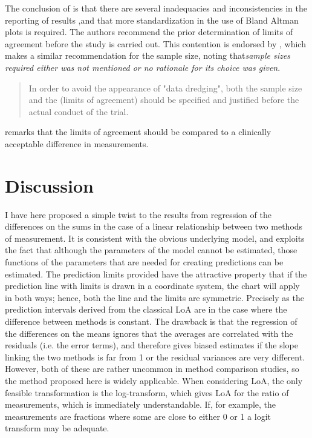 \documentclass[Main.tex]{subfiles}
\begin{document}
	The conclusion of \citet{mantha} is that there are several
	inadequacies and inconsistencies in the reporting of results ,and
	that more standardization in the use of Bland Altman plots is
	required. The authors recommend the prior determination of limits
	of agreement before the study is carried out. This contention is
	endorsed by \citet{lin}, which makes a similar recommendation for
	the sample size, noting that\emph{sample sizes required either was
		not mentioned or no rationale for its choice was given}.
	
	\begin{quote}
		In order to avoid the appearance of "data dredging", both the
		sample size and the (limits of agreement) should be specified and
		justified before the actual conduct of the trial. \citep{lin}
	\end{quote}
	
	\citet{Dewitte} remarks that the limits of agreement should be
	compared to a clinically acceptable difference in measurements.
	


\section{Discussion}
I have here proposed a simple twist to the results from regression of the differences on the sums in the case of a linear relationship
between two methods of measurement. It is consistent with the obvious underlying model, and exploits the fact that although
the parameters of the model cannot be estimated, those functions of the parameters that are needed for creating predictions
can be estimated.
The prediction limits provided have the attractive property that if the prediction line with limits is drawn in a coordinate
system, the chart will apply in both ways; hence, both the line and the limits are symmetric. Precisely as the prediction intervals
derived from the classical LoA are in the case where the difference between methods is constant.
The drawback is that the regression of the differences on the means ignores that the averages are correlated with the residuals
(i.e. the error terms), and therefore gives biased estimates if the slope linking the two methods is far from 1 or the residual
variances are very different. However, both of these are rather uncommon in method comparison studies, so the method proposed
here is widely applicable.
When considering LoA, the only feasible transformation is the log-transform, which gives LoA for the ratio of measurements,
which is immediately understandable. If, for example, the measurements are fractions where some are close to either 0 or 1 a
logit transform may be adequate. 
\end{document}
